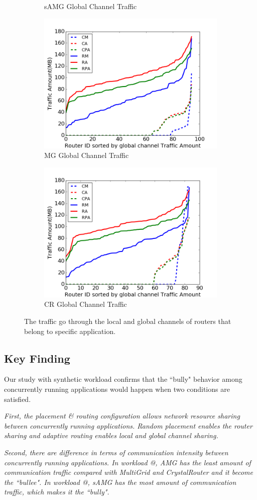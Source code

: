 \documentclass[conference,compsoc]{IEEEtran}
\makeatletter
\newcommand{\Rmnum}[1]{\expandafter\@slowromancap\romannumeral #1@}
\makeatother
\begin{document}
\begin{figure}[t]
\begin{subfigure}[t]{0.32\textwidth}
        \caption{sAMG Global Channel Traffic}
        \label{fig:syn-samg-gc-traffic}
    \end{subfigure}\hfill
    \hspace{1em}%
    \begin{subfigure}[t]{0.32\textwidth}
        \centering
        \includegraphics[height=1.5 in]{syn-wkld/mg/gc-traffic}
        \caption{MG Global Channel Traffic}
        \label{fig:syn-mg-gc-traffic}
    \end{subfigure}\hfill
    \begin{subfigure}[t]{0.32\textwidth}
        \centering
        \includegraphics[height=1.5 in]{syn-wkld/cr/gc-traffic}
        \caption{CR Global Channel Traffic}
        \label{fig:syn-cr-gc-traffic}
    \end{subfigure}%
   \caption{The traffic go through the local and global channels of routers that belong to specific application.}
   \label{fig:syn-3app-gc-traffic}
\end{figure}


\subsection{Key Finding}
Our study with synthetic workload confirms that the ``bully" behavior among concurrently running applications would happen when two conditions are satisfied.

\emph{First, the placement \& routing configuration allows network resource sharing between concurrently running applications. Random placement enables the router sharing and adaptive routing enables local and global channel sharing.}

\emph{Second, there are difference in terms of communication intensity between concurrently running applications. In workload \Rmnum{1}, AMG has the least amount of communication traffic compared with MultiGrid and CrystalRouter and it become the ``bullee". In workload \Rmnum{2}, sAMG has the most amount of communication traffic, which makes it the ``bully". }
\end{document}
